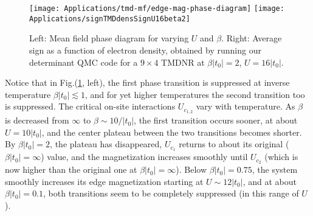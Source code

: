 \vspace{-0.6cm}
\begin{figure}[H]
\hspace{0.3cm}
\texttt{[image: Applications/tmd-mf/edge-mag-phase-diagram]}
\texttt{[image: Applications/signTMDdensSignU16beta2]}
	\caption[Mean field phase diagram for varying $U$ and $\beta$. Average sign as a function of electron density, obtained by running our determinant \ac{QMC} code for a $9 \times 4$ \acs{TMDNR} at $\beta | t_0 | = 2$, $U = 16| t_0 |$.]{Left: Mean field phase diagram for varying $U$ and $\beta$. Right: Average sign as a function of electron density, obtained by running our determinant \ac{QMC} code for a $9 \times 4$ \acs{TMDNR} at $\beta | t_0 | = 2$, $U = 16| t_0 |$.}
	\label{fig:pdMF}
\end{figure}
\vspace{-0.3cm}
Notice that in Fig.(\ref{fig:pdMF}, left), the first phase transition is suppressed at inverse temperature $\beta  | t_0 | \lesssim 1$, and for yet higher temperatures the second transition too is suppressed.
The critical on-site interactions $U_{c_{1, 2}}$ vary with temperature.
As $\beta$ is decreased from $\infty$ to $\beta  \sim 10 /  | t_0 |$, the first transition occurs sooner, at about $U = 10 | t_0 |$, and the center plateau between the two transitions becomes shorter.
By $\beta | t_0 | = 2 $, the plateau has disappeared, $U_{c_1}$ returns to about its original ($\beta | t_0 | = \infty$) value, and the magnetization increases smoothly until $U_{c_2}$ (which is now higher than the original one at $\beta | t_0 | = \infty$).
Below $\beta | t_0 | = 0.75$, the system smoothly increases its edge magnetization starting at $U \sim 12 | t_0 |$, and at about $\beta | t_0 | = 0.1$, both transitions seem to be completely suppressed (in this range of $U$).

